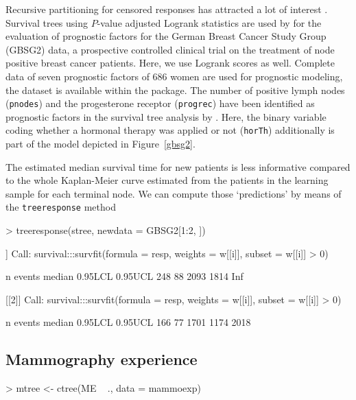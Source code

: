 \documentclass{Z}
\begin{document}
Recursive partitioning for censored responses has attracted a lot of interest
\citep[e.g.,][]{regression:1988,relative-r:1992}. 
Survival trees using $P$-value adjusted Logrank statistics
are used by \cite{statistics:2001a} 
for the evaluation of prognostic factors for the German Breast
Cancer Study Group (GBSG2) data,  a prospective controlled clinical trial on the
treatment of node positive breast cancer patients. Here, we use
Logrank scores as well. Complete data of seven prognostic factors of $686$
women are used for prognostic modeling, the
dataset is available within the 
 package.
The number of positive lymph nodes
(\texttt{pnodes}) and the progesterone receptor (\texttt{progrec}) have
been identified as prognostic factors in the survival tree analysis
by \cite{statistics:2001a}.  Here, the binary variable coding whether a
hormonal therapy was applied or not (\texttt{horTh}) additionally is
part of the model depicted in Figure~\ref{gbsg2}.

The estimated median survival time for new patients is less informative
compared to the whole Kaplan-Meier curve estimated from the patients in the
learning sample for each terminal node. We can compute those `predictions'
by means of the \texttt{treeresponse} method
\begin{Schunk}
\begin{Sinput}
> treeresponse(stree, newdata = GBSG2[1:2, ])
\end{Sinput}
\begin{Soutput}
[[1]]
Call: survival:::survfit(formula = resp, weights = w[[i]], subset = w[[i]] > 
    0)

      n  events  median 0.95LCL 0.95UCL 
    248      88    2093    1814     Inf 

[[2]]
Call: survival:::survfit(formula = resp, weights = w[[i]], subset = w[[i]] > 
    0)

      n  events  median 0.95LCL 0.95UCL 
    166      77    1701    1174    2018 
\end{Soutput}
\end{Schunk}

\subsection{Mammography experience}

\begin{Schunk}
\begin{Sinput}
> mtree <- ctree(ME ~ ., data = mammoexp)
\end{Sinput}
\end{Schunk}
\end{document}
